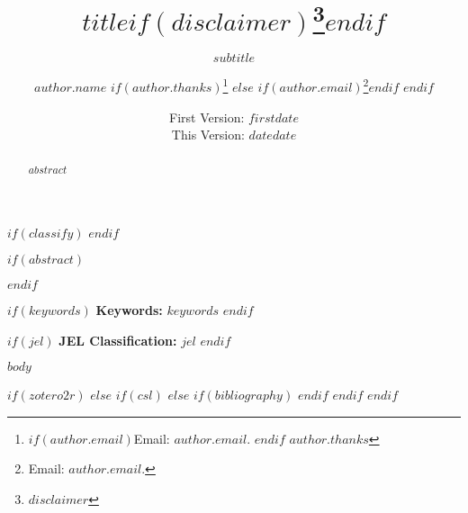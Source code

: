 \documentclass[$if(fontsize)$$fontsize$$else$12pt$endif$,$for(classoption)$$classoption$$sep$,$endfor$]{article}
\title{$title$$if(disclaimer)$\thanks{$disclaimer$}$endif$}
\subtitle{$subtitle$}
\author{$author.name$%
        $if(author.thanks)$\thanks{%
            $if(author.email)$Email: $author.email$. $endif$%
            $author.thanks$}%
        $else$%
            $if(author.email)$\thanks{Email:  $author.email$.}$endif$%
        $endif$}
\affil{$author.affil$}
\date{First Version:  $firstdate$ \\[0.5em] This Version:  $date$}
\date{$date$}
\begin{document}
\maketitle
\thispagestyle{fancy}
$if(classify)$
$endif$

$if(abstract)$
\justifying
\begin{abstract}
\justify $abstract$
\end{abstract}
\RaggedRight
\smallskip
$endif$

$if(keywords)$
\hspace{4mm}\textbf{Keywords:}  $keywords$
\smallskip
$endif$

$if(jel)$
\hspace{4mm}\textbf{JEL Classification:} $jel$
$endif$

\clearpage
{}
\fancyfoot[C]{\thepage}
\doublespacing
\RaggedRight
\setlength\parindent{1.5em}

$body$

$if(zotero2r)$
  \newpage
  \printbibliography
$else$
  $if(csl)$
  \newpage
  \singlespacing
  \setlength\parindent{-0.5em}
  $else$
    $if(bibliography)$
      \newpage
      \printbibliography[title={References}]
    $endif$
  $endif$
$endif$
\end{document}
